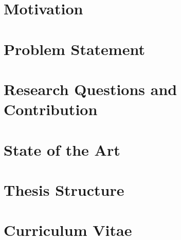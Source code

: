 \section{Motivation}

\section{Problem Statement}

\section{Research Questions and Contribution}

\section{State of the Art}

\section{Thesis Structure}

\section{Curriculum Vitae}
